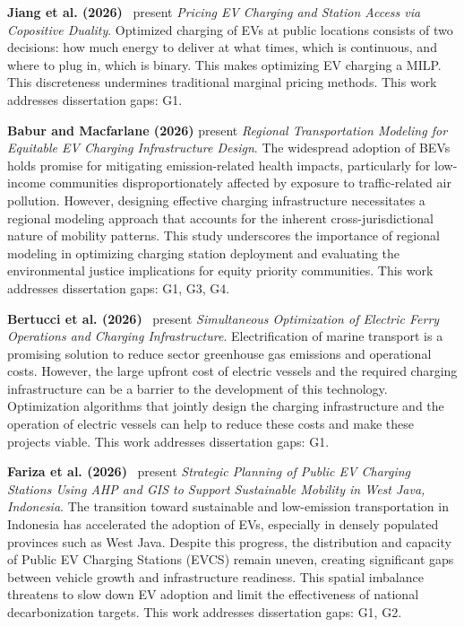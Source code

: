 \documentclass[letterpaper, 12pt, oneside, doublespacing]{Thesis}
\begin{document}
\noindent \textbf{Jiang et al. (2026)}~\cite{pricing_electric_2026} present \textit{Pricing EV Charging and Station Access via Copositive Duality}. Optimized charging of EVs at public locations consists of two decisions: how much energy to deliver at what times, which is continuous, and where to plug in, which is binary. This makes optimizing EV charging a MILP. This discreteness undermines traditional marginal pricing methods. This work addresses dissertation gaps: G1.



\noindent \textbf{Babur and Macfarlane (2026)} present \textit{Regional Transportation Modeling for Equitable EV Charging Infrastructure Design}. The widespread adoption of BEVs holds promise for mitigating emission-related health impacts, particularly for low-income communities disproportionately affected by exposure to traffic-related air pollution. However, designing effective charging infrastructure necessitates a regional modeling approach that accounts for the inherent cross-jurisdictional nature of mobility patterns. This study underscores the importance of regional modeling in optimizing charging station deployment and evaluating the environmental justice implications for equity priority communities. This work addresses dissertation gaps: G1, G3, G4.



\noindent \textbf{Bertucci et al. (2026)}~\cite{simultaneous_optimization_2026} present \textit{Simultaneous Optimization of Electric Ferry Operations and Charging Infrastructure}. Electrification of marine transport is a promising solution to reduce sector greenhouse gas emissions and operational costs. However, the large upfront cost of electric vessels and the required charging infrastructure can be a barrier to the development of this technology. Optimization algorithms that jointly design the charging infrastructure and the operation of electric vessels can help to reduce these costs and make these projects viable. This work addresses dissertation gaps: G1.



\noindent \textbf{Fariza et al. (2026)}~\cite{strategic_planning_2026} present \textit{Strategic Planning of Public EV Charging Stations Using AHP and GIS to Support Sustainable Mobility in West Java, Indonesia}. The transition toward sustainable and low-emission transportation in Indonesia has accelerated the adoption of EVs, especially in densely populated provinces such as West Java. Despite this progress, the distribution and capacity of Public EV Charging Stations (EVCS) remain uneven, creating significant gaps between vehicle growth and infrastructure readiness. This spatial imbalance threatens to slow down EV adoption and limit the effectiveness of national decarbonization targets. This work addresses dissertation gaps: G1, G2.
\end{document}
